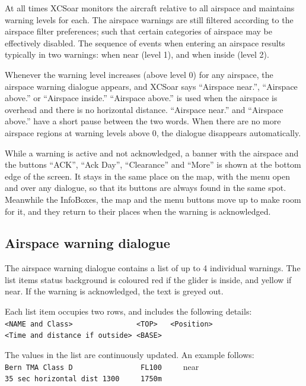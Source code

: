 At all times XCSoar monitors the aircraft relative to all airspace and
maintains warning levels for each.  The airspace warnings are still
filtered according to the airspace filter preferences; such that
certain categories of airspace may be effectively disabled.
The sequence of events when entering an airspace results typically
in two warnings: when near (level 1), and when inside (level 2).

Whenever the warning level increases (above level 0) for any airspace,
the airspace warning dialogue appears, and XCSoar says ``Airspace
near.'', ``Airspace above.'' or ``Airspace inside.'' ``Airspace
above.'' is used when the airspace is overhead and there is no
horizontal distance. ``Airspace near.'' and ``Airspace above.'' have
a short pause between the two words.
When there are no more airspace regions at warning levels above
0, the dialogue disappears automatically.

While a warning is active and not acknowledged, a banner with the
airspace and the buttons ``ACK'', ``Ack Day'', ``Clearance'' and
``More'' is shown at the bottom edge of the screen.  It stays in the
same place on the map, with the menu open and over any dialogue, so
that its buttons are always found in the same spot.  Meanwhile the
InfoBoxes, the map and the menu buttons move up to make room for it,
and they return to their places when the warning is acknowledged.


\subsection*{Airspace warning dialogue}

The airspace warning dialogue contains a list of up to 4 individual
warnings.  The list items status background is coloured red if the glider is
inside, and yellow if near.  If the warning is acknowledged, the
text is greyed out.

Each list item occupies two rows, and includes the following details:\\
\verb+<NAME and Class>               <TOP>   <Position>+\\
\verb+<Time and distance if outside> <BASE>+

The values in the list are continuously updated. 
An example follows:\\
\verb+Bern TMA Class D                FL100     +\colorbox{AirspaceYellow}{near}\\
\verb+35 sec horizontal dist 1300     1750m+

